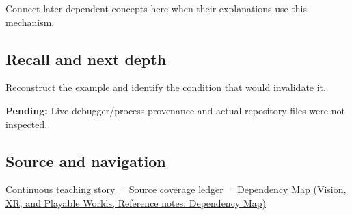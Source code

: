 \hypertarget{appendix-230b59c0676b-used-by}{}

Connect later dependent concepts here when their explanations use this mechanism.

\subsection{Recall and next depth}\label{appendix-230b59c0676b-recall-and-next-depth}

\hypertarget{appendix-230b59c0676b-recall-and-next-depth}{}

Reconstruct the example and identify the condition that would invalidate it.

\textbf{Pending:} Live debugger/process provenance and actual repository files were not inspected.

\subsection{Source and navigation}\label{appendix-230b59c0676b-source-and-navigation}

\hypertarget{appendix-230b59c0676b-source-and-navigation}{}

\hyperref[01-foundations-i-ch002-bytes-become-a-durable-agreement]{Continuous teaching story} · {Source coverage ledger} · \href{../07-Vision-XR-and-Playable-Worlds/main.pdf\#nameddest=appendix-4ad47bdd269a}{Dependency Map (Vision, XR, and Playable Worlds, Reference notes: Dependency Map)}
